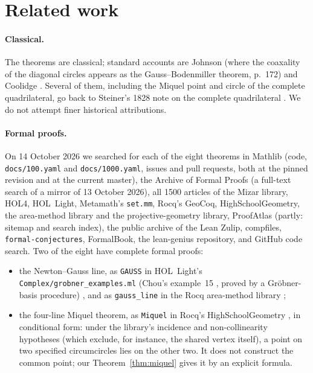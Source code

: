 \documentclass[11pt]{article}
\theoremstyle{definition}
\theoremstyle{remark}
\newcommand{\lean}[1]{\texttt{#1}}
\begin{document}
\section{Related work}\label{sec:related}
\paragraph{Classical.} The theorems are classical; standard accounts are Johnson \cite{johnson1929}
(where the coaxality of the diagonal circles appears as the Gauss--Bodenmiller theorem, p.~172) and
Coolidge \cite{coolidge1916}. Several of them, including the Miquel point and circle of the complete
quadrilateral, go back to Steiner's 1828 note on the complete quadrilateral \cite{steiner1828}. We do
not attempt finer historical attributions.

\paragraph{Formal proofs.} On 14 October 2026 we searched for each of the eight theorems in Mathlib
(code, \texttt{docs/100.yaml} and \texttt{docs/1000.yaml}, issues and pull requests, both at the pinned
revision and at the current master), the Archive of Formal Proofs (a full-text search of a mirror of
13 October 2026), all 1500 articles of the Mizar library, HOL4, HOL~Light, Metamath's \texttt{set.mm},
Rocq's GeoCoq, HighSchoolGeometry, the area-method library and the projective-geometry library,
ProofAtlas (partly: sitemap and search index), the public archive of the Lean Zulip, compfiles,
\texttt{formal-conjectures}, FormalBook, the lean-genius repository, and GitHub code search. Two of the
eight have complete formal proofs:
\begin{itemize}
\item the Newton--Gauss line, as \lean{GAUSS} in HOL~Light's \lean{Complex/grobner\_examples.ml}
(Chou's example~15 \cite{chou1988}, proved by a Gr\"obner-basis procedure) \cite{hollight}, and as
\lean{gauss\_line} in the Rocq area-method library \cite{areamethod};
\item the four-line Miquel theorem, as \lean{Miquel} in Rocq's HighSchoolGeometry
\cite{hsgeometry,guilhot2005}, in conditional form: under the library's incidence and
non-collinearity hypotheses (which exclude, for instance, the shared vertex itself), a point on two
specified circumcircles lies on the other two. It does not construct the common point; our
Theorem~\ref{thm:miquel} gives it by an explicit formula.
\end{itemize}
\end{document}
